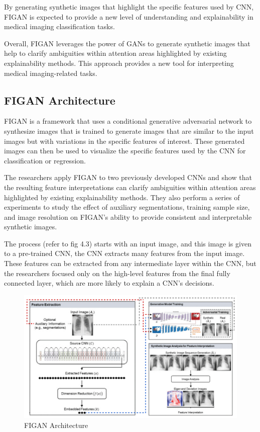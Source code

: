 \noindent
By generating synthetic images that highlight the specific features used by CNN, FIGAN is expected to provide a new level of understanding and explainability in medical imaging classification tasks. 

\noindent
Overall, FIGAN leverages the power of GANs to generate synthetic images that help to clarify ambiguities within attention areas highlighted by existing explainability methods. This approach provides a new tool for interpreting medical imaging-related tasks.

\subsection{FIGAN Architecture}

\noindent
FIGAN is a framework that uses a conditional generative adversarial network to synthesize images that is trained to generate images that are similar to the input images but with variations in the specific features of interest. These generated images can then be used to visualize the specific features used by the CNN for classification or regression.

\noindent
The researchers apply FIGAN to two previously developed CNNs and show that the resulting feature interpretations can clarify ambiguities within attention areas highlighted by existing explainability methods. They also perform a series of experiments to study the effect of auxiliary segmentations, training sample size, and image resolution on FIGAN's ability to provide consistent and interpretable synthetic images.

\noindent
The process (refer to fig 4.3) starts with an input image, and this image is given to a pre-trained CNN, the CNN extracts many features from the input image. These features can be extracted from any intermediate layer within the CNN, but the researchers focused only on the high-level features from the final fully connected layer, which are more likely to explain a CNN’s decisions.

\clearpage

\begin{figure}[h!]
    \centering
    \includegraphics[width=\textwidth]{Images/figan_arch.png}
    \caption{FIGAN Architecture}
\end{figure}

